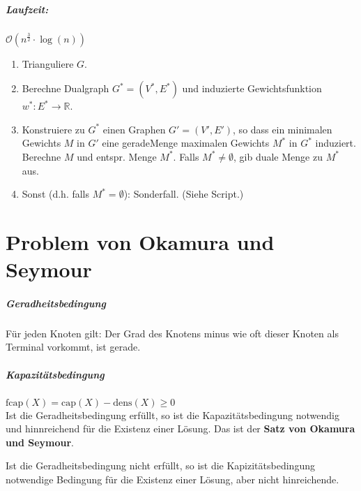 \documentclass[a4paper,11pt]{report}
\begin{document}
\paragraph{Laufzeit:} $\mathcal{O}(n^{\frac{3}{2}} \cdot \log(n))$

\begin{enumerate}
    \item Trianguliere $G$.
    \item Berechne Dualgraph $G^* = (V^*, E^*)$ und induzierte Gewichtsfunktion $w^* : E^* \rightarrow \mathbb{R}$.
    \item Konstruiere zu $G^*$ einen Graphen $G' = (V', E')$, so dass ein  minimalen Gewichts $M$ in $G'$ eine \gls{geradeMenge} maximalen Gewichts $M^*$ in $G^*$ induziert. Berechne $M$ und entspr. Menge $M^*$. Falls $M^* \neq \emptyset$, gib duale Menge zu $M^*$ aus.
    \item Sonst (d.h. falls $M^* = \emptyset$): Sonderfall. (Siehe Script.)
\end{enumerate}


\chapter{Problem von Okamura und Seymour}
\paragraph{Geradheitsbedingung}
Für jeden Knoten gilt: Der Grad des Knotens minus wie oft dieser Knoten als Terminal vorkommt, ist gerade.

\paragraph{Kapazitätsbedingung} $\text{fcap}(X) = \text{cap}(X) - \text{dens}(X) \geq 0$\\

Ist die Geradheitsbedingung erfüllt, so ist die Kapazitätsbedingung notwendig und hinnreichend für die Existenz einer Lösung. Das ist der \textbf{Satz von Okamura und Seymour}.

Ist die Geradheitsbedingung nicht erfüllt, so ist die Kapizitätsbedingung notwendige Bedingung für die Existenz einer Lösung, aber nicht hinreichende.
\end{document}
